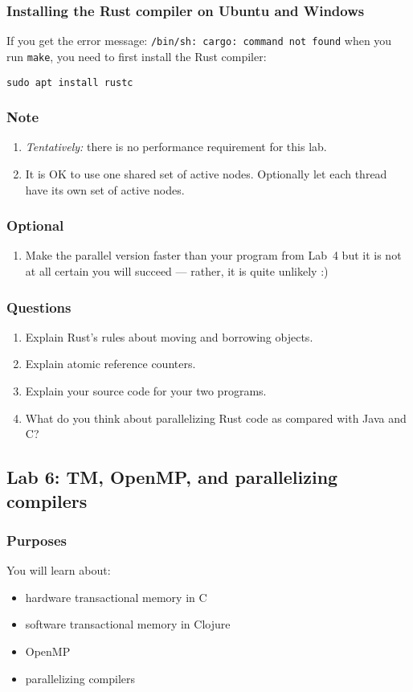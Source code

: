 \documentclass{forsete}
\begin{document}
{\subsubsection*{Installing the Rust compiler on Ubuntu and Windows}
If you get the error message: \verb!/bin/sh: cargo: command not found! when you run \verb!make!, you need to 
first install the Rust compiler:
\begin{verbatim}
sudo apt install rustc
\end{verbatim}

\subsubsection*{Note}
\begin{enumerate}
\item {\em Tentatively:} there is no performance requirement for this lab. 
\item It is OK to use one shared set of active nodes. Optionally let each thread have
its own set of active nodes.
\end{enumerate}

\subsubsection*{Optional}
\begin{enumerate}
\item Make the parallel version faster than your program from Lab~4 but it is not at all certain you will succeed --- rather, it is quite unlikely :)
\end{enumerate}
\subsubsection*{Questions}
\begin{enumerate}
\item Explain Rust's rules about moving and borrowing objects.
\item Explain atomic reference counters.
\item Explain your source code for your two programs.
\item What do you think about parallelizing Rust code as compared with Java and C?
\end{enumerate}
\newpage
\subsection*{Lab 6: TM, OpenMP, and parallelizing compilers}
\subsubsection*{Purposes}
You will learn about:
\begin{itemize}
\item hardware transactional memory in C
\item software transactional memory in Clojure
\item OpenMP
\item parallelizing compilers
\end{itemize}

}
\end{document}
